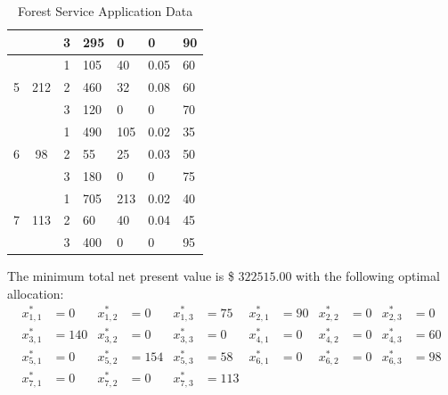 \documentclass[a4paper,10 pt,titlepage,twoside]{book}
\theoremstyle{plain}
\theoremstyle{definition}
\theoremstyle{remark}
\begin{document}
\begin{table}[]
\begin{tabular}{cccllll}
		&  & 3 & 295 & 0 & 0 & 90 \\ \hline
		\multirow{3}{*}{5} & \multirow{3}{*}{212} & 1 & 105 & 40 & 0.05 & 60 \\
		&  & 2 & 460 & 32 & 0.08 & 60 \\
		&  & 3 & 120 & 0 & 0 & 70 \\ \hline
		\multirow{3}{*}{6} & \multirow{3}{*}{98} & 1 & 490 & 105 & 0.02 & 35 \\
		&  & 2 & 55 & 25 & 0.03 & 50 \\
		&  & 3 & 180 & 0 & 0 & 75 \\ \hline
		\multirow{3}{*}{7} & \multirow{3}{*}{113} & 1 & 705 & 213 & 0.02 & 40 \\
		&  & 2 & 60 & 40 & 0.04 & 45 \\
		&  & 3 & 400 & 0 & 0 & 95 \\ \hline
	\end{tabular}\caption{\label{table:timber}Forest Service Application Data}
\end{table}

The minimum total net present value is \$ $322515.00$ with the following optimal allocation:
\begin{align*}
x_{1,1}^{*} &=  0 & x_{1,2}^{*}&= 0 & x_{1,3}^{*} &= 75 & x_{2,1}^{*} &= 90 & x_{2,2}^{*} &= 0 & x_{2,3}^{*} &= 0\\
x_{3,1}^{*} &= 140 & x_{3,2}^{*}&= 0 & x_{3,3}^{*} &= 0 & x_{4,1}^{*} &= 0 & x_{4,2}^{*} &= 0 & x_{4,3}^{*} &= 60\\
x_{5,1}^{*} &= 0 & x_{5,2}^{*}&= 154 & x_{5,3}^{*} &= 58 & x_{6,1}^{*} &= 0 & x_{6,2}^{*} &= 0 & x_{6,3}^{*} &= 98\\
 x_{7,1}^{*}&=0 &x_{7,2}^{*} &= 0 & x_{7,3}^{*} &= 113 & & & &  & & \\
\end{align*}
\end{document}
